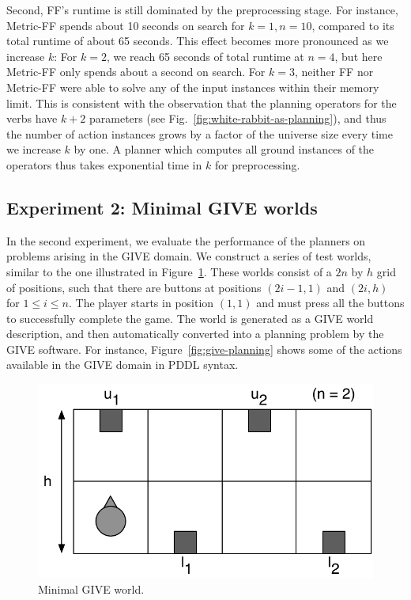 Second, FF's runtime is still dominated by the preprocessing
stage. For instance, Metric-FF spends about 10 seconds on search for
$k=1,n=10$, compared to its total runtime of about 65 seconds. This
effect becomes more pronounced as we increase $k$: For $k=2$, we reach
65 seconds of total runtime at $n=4$, but here Metric-FF only spends
about a second on search. For $k=3$, neither FF nor Metric-FF were
able to solve any of the input instances within their memory
limit. This is consistent with the observation that the planning
operators for the verbs have $k+2$ parameters (see
Fig.~\ref{fig:white-rabbit-as-planning}), and thus the number of
action instances grows by a factor of the universe size every time we
increase $k$ by one. A planner which computes all ground instances of
the operators thus takes exponential time in $k$ for preprocessing.




\subsection{Experiment 2: Minimal GIVE worlds}
\label{sec:exper-2:-minim}

In the second experiment, we evaluate the performance of the planners on
problems arising in the GIVE domain. We construct a series of test worlds,
similar to the one illustrated in Figure~\ref{fig:give-minimal}. These
worlds consist of a $2n$ by $h$ grid of positions, such that there are
buttons at positions $(2i-1,1)$ and $(2i,h)$ for $1 \leq i \leq n$. The
player starts in position $(1,1)$ and must press all the buttons
to successfully complete the game. The world is generated as a GIVE world
description, and then automatically converted into a planning problem by
the GIVE software. For instance, Figure~\ref{fig:give-planning} shows some
of the actions available in the GIVE domain in PDDL syntax.

\begin{figure}[t]
  \centering
  \includegraphics[width=0.5\columnwidth]{pic-buttons}
  \caption{Minimal GIVE world.}
  \label{fig:give-minimal}
\end{figure}

